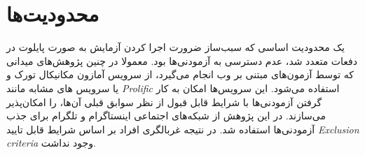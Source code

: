 




\section{محدودیت‌ها}
یک محدودیت اساسی  که سبب‌ساز ضرورت اجرا کردن آزمایش به صورت
پایلوت در دفعات متعدد شد، عدم دسترسی به آزمودنی‌ها بود. معمولا
در چنین پژوهش‌های میدانی که توسط آزمون‌های مبتنی بر وب
انجام می‌گیرد، از سرویس آمازون مکانیکال تورک و یا سرویس های مشابه مانند
\textit{
    \gls{Prolific}
}
استفاده می‌شود. این سرویس‌ها امکان به کار گرفتن آزمودنی‌ها با شرایط قابل قبول
از نظر سوابق قبلی آن‌ها، را امکان‌پذیر می‌سازند. در این پژوهش از
شبکه‌های اجتماعی  اینستاگرام و تلگرام برای جذب آزمودنی‌ها استفاده شد. در
نتیجه غربالگری افراد بر اساس شرایط قابل تایید
\textit{
    \gls{Exclusion criteria}
}
وجود نداشت.

